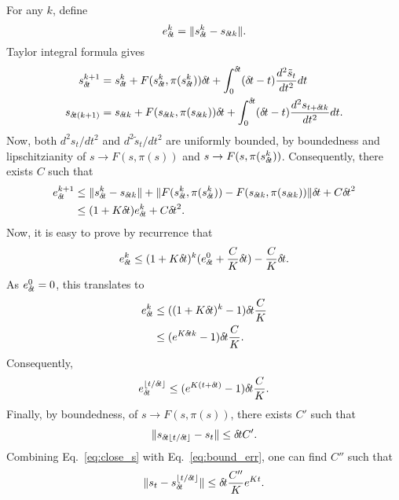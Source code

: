For any $k$, define
\begin{equation}
	e_{\delta\hspace{-.1em}t}^k = \|s_{\delta\hspace{-.1em}t}^k - s_{{\delta\hspace{-.1em}t} k}\|.
\end{equation}
Taylor integral formula gives
\begin{align}
	s_{\delta\hspace{-.1em}t}^{k + 1} &= s_{\delta\hspace{-.1em}t}^k + F(s_{\delta\hspace{-.1em}t}^k, \pi(s_{\delta\hspace{-.1em}t}^k)) {\delta\hspace{-.1em}t} +
	\int_{0}^{\delta\hspace{-.1em}t} ({\delta\hspace{-.1em}t} - t) \frac{d^2 \tilde{s}_t}{dt^2} dt\\
	s_{{\delta\hspace{-.1em}t}(k + 1)} &= s_{{\delta\hspace{-.1em}t} k} + F(s_{{\delta\hspace{-.1em}t} k}, \pi(s_{{\delta\hspace{-.1em}t} k})) {\delta\hspace{-.1em}t} +
	\int_0^{\delta\hspace{-.1em}t} ({\delta\hspace{-.1em}t} - t) \frac{d^2 s_{t + {\delta\hspace{-.1em}t} k}}{dt^2} dt.
\end{align}
Now, both $d^2 s_t/dt^2$ and $d^2 \tilde{s}_t/dt^2$ are uniformly bounded, by
boundedness and lipschitzianity of $s \rightarrow F(s, \pi(s))$ and $s
\rightarrow F(s, \pi(s_{\delta\hspace{-.1em}t}^k))$. Consequently, there exists $C$ such that
\begin{align}
	e_{\delta\hspace{-.1em}t}^{k + 1} &\leq \|s_{\delta\hspace{-.1em}t}^k - s_{{\delta\hspace{-.1em}t} k}\| + \|F(s_{\delta\hspace{-.1em}t}^k, \pi(s_{\delta\hspace{-.1em}t}^k)) - F(s_{{\delta\hspace{-.1em}t} k}, \pi(s_{{\delta\hspace{-.1em}t} k}))\| {\delta\hspace{-.1em}t} + C {\delta\hspace{-.1em}t}^2\\
			  &\leq (1 + K {\delta\hspace{-.1em}t}) e_{\delta\hspace{-.1em}t}^k + C {\delta\hspace{-.1em}t}^2.
\end{align}
Now, it is easy to prove by recurrence that
\begin{equation}
	e_{\delta\hspace{-.1em}t}^k \leq (1 + K {\delta\hspace{-.1em}t})^k (e_{\delta\hspace{-.1em}t}^0 + \frac{C}{K} {\delta\hspace{-.1em}t}) - \frac{C}{K}{\delta\hspace{-.1em}t}.
\end{equation}
As $e_{\delta\hspace{-.1em}t}^0 = 0$, this translates to
\begin{align}
	e_{\delta\hspace{-.1em}t}^k &\leq ((1 + K {\delta\hspace{-.1em}t})^k - 1) {\delta\hspace{-.1em}t} \frac{C}{K}\\
		    &\leq (e^{K {\delta\hspace{-.1em}t} k} - 1) {\delta\hspace{-.1em}t} \frac{C}{K}.
\end{align}
Consequently,
\begin{equation}
	e_{\delta\hspace{-.1em}t}^{\lfloor t / {\delta\hspace{-.1em}t} \rfloor} \leq (e^{K(t + {\delta\hspace{-.1em}t})} - 1) {\delta\hspace{-.1em}t} \frac{C}{K}.
	\label{eq:bound_err}
\end{equation}
Finally, by boundedness, of $s \rightarrow F(s, \pi(s))$, there exists $C'$ such that
\begin{equation}
	\|s_{{\delta\hspace{-.1em}t}\lfloor t / {\delta\hspace{-.1em}t} \rfloor} - s_t \| \leq {\delta\hspace{-.1em}t} C'.
	\label{eq:close_s}
\end{equation}
Combining Eq.~\eqref{eq:close_s} with Eq.~\eqref{eq:bound_err}, one can find $C''$ such that
\begin{equation}
	\|s_t - s_{\delta\hspace{-.1em}t}^{\lfloor t / {\delta\hspace{-.1em}t} \rfloor}\| \leq {\delta\hspace{-.1em}t} \frac{C''}{K} e^{Kt}.
\end{equation}
